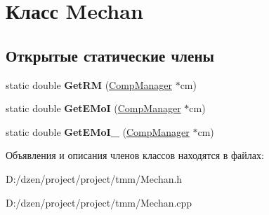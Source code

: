 \hypertarget{class_mechan}{
\section{Класс Mechan}
\label{class_mechan}
}
\subsection*{Открытые статические члены}
\begin{DoxyCompactItemize}
\item 
\hypertarget{class_mechan_adb70ee123f843811dd5b6675daba4858}{
static double {\bfseries GetRM} (\hyperlink{class_comp_manager}{CompManager} $\ast$cm)}
\label{class_mechan_adb70ee123f843811dd5b6675daba4858}

\item 
\hypertarget{class_mechan_af6351592a6b42de68088a41d4449ffbf}{
static double {\bfseries GetEMoI} (\hyperlink{class_comp_manager}{CompManager} $\ast$cm)}
\label{class_mechan_af6351592a6b42de68088a41d4449ffbf}

\item 
\hypertarget{class_mechan_ab9e50f0cb1a2a715d336397e46000108}{
static double {\bfseries GetEMoI\_\-} (\hyperlink{class_comp_manager}{CompManager} $\ast$cm)}
\label{class_mechan_ab9e50f0cb1a2a715d336397e46000108}

\end{DoxyCompactItemize}


Объявления и описания членов классов находятся в файлах:\begin{DoxyCompactItemize}
\item 
D:/dzen/project/project/tmm/Mechan.h\item 
D:/dzen/project/project/tmm/Mechan.cpp\end{DoxyCompactItemize}

